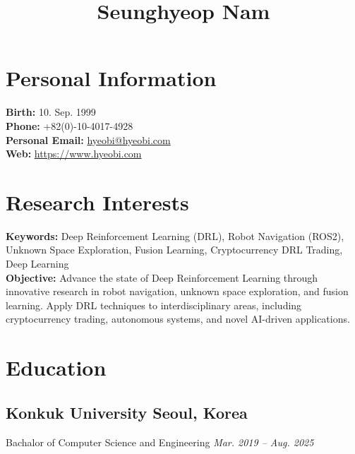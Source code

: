 \documentclass[11pt,a4paper]{article}
\makeatletter
\renewcommand{\maketitle}{
    \begin{center}
        \vspace*{-1in}
        {\LARGE \bfseries \@title \par}
        \vspace{0.5em}
        {\large \@author \par}
        \vspace{1em}
        {\@date \par}
    \end{center}
    \vspace{1em}
}
\makeatother
\begin{document}
\title{\textbf{Seunghyeop Nam}}
\author{}
\date{}
\maketitle

\section*{Personal Information}
\textbf{Birth:} 10. Sep. 1999 \\
\textbf{Phone:} +82(0)-10-4017-4928 \\
\textbf{Personal Email:} \href{mailto:hyeobi@hyeobi.com}{hyeobi@hyeobi.com} \\
\textbf{Web:} \href{https://www.hyeobi.com}{https://www.hyeobi.com}

\section*{Research Interests}
\textbf{Keywords:} Deep Reinforcement Learning (DRL), Robot Navigation (ROS2), Unknown Space Exploration, Fusion Learning, Cryptocurrency DRL Trading, Deep Learning \\
\textbf{Objective:} Advance the state of Deep Reinforcement Learning through innovative research in robot navigation, unknown space exploration, and fusion learning. Apply DRL techniques to interdisciplinary areas, including cryptocurrency trading, autonomous systems, and novel AI-driven applications.

\section*{Education}
\subsection*{\textbf{Konkuk University} \hfill Seoul, Korea}
Bachalor of Computer Science and Engineering \hfill \textit{Mar. 2019 – Aug. 2025}
\end{document}
